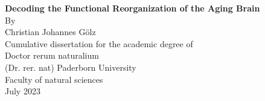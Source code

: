 \begin{titlepage}
    \begin{center}
        \vspace*{1cm}
        \LARGE
        \textbf{Decoding the Functional Reorganization of the Aging Brain}\\
        \vspace{1.5cm}
        \Large
        By\\
        \vspace{0.5cm}
        Christian Johannes Gölz\\
        \vspace{0.5cm}       
        Cumulative dissertation for the academic degree of\\
        Doctor rerum naturalium\\
        (Dr. rer. nat)
        \vfill
        \Large
        Paderborn University\\
        Faculty of natural sciences\\
        July 2023
            
    \end{center}
\end{titlepage}

